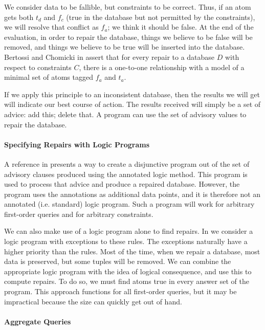 We consider data to be fallible, but constraints to be correct. Thus, if an atom gets both $t_d$ and $f_c$ (true in the database but not permitted by the constraints), we will resolve that conflict as $f_a$; we think it should be false. At the end of the evaluation, in order to repair the database, things we believe to be false will be removed, and things we believe to be true will be inserted into the database. Bertossi and Chomicki in \cite{CQ} assert that for every repair to a database $D$ with respect to constraints $C$, there is a one-to-one relationship with a model of a minimal set of atoms tagged $f_a$ and $t_a$.

If we apply this principle to an inconsistent database, then the results we will get will indicate our best course of action. The results received will simply be a set of advice: add this; delete that. A program can use the set of advisory values to repair the database.

\paragraph{Specifying Repairs with Logic Programs}

A reference in \cite{CQ} presents a way to create a disjunctive program out of the set of advisory clauses produced using the annotated logic method. This program is used to process that advice and produce a repaired database. However, the program uses the annotations as additional data points, and it is therefore not an annotated (i.e. standard) logic program. Such a program will work for arbitrary first-order queries and for arbitrary constraints.


We can also make use of a logic program alone to find repairs. In \cite{CQ} we consider a logic program with exceptions to these rules. The exceptions naturally have a higher priority than the rules. Most of the time, when we repair a database, most data is preserved, but some tuples will be removed. We can combine the appropriate logic program with the idea of logical consequence, and use this to compute repairs. To do so, we must find atoms true in every answer set of the program. This approach functions for all first-order queries, but it may be impractical because the size can quickly get out of hand.

\paragraph{Aggregate Queries}

